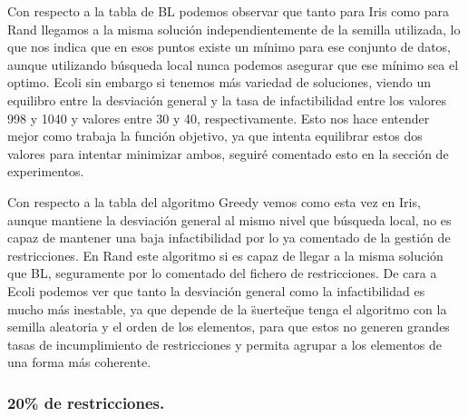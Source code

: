\documentclass[12pt, spanish]{article}
\begin{document}
Con respecto a la tabla de BL podemos observar que tanto para Iris como para Rand llegamos a la misma solución independientemente de la semilla utilizada, lo que nos indica que en esos puntos existe un mínimo para ese conjunto de datos, aunque utilizando búsqueda local nunca podemos asegurar que ese mínimo sea el optimo. Ecoli sin embargo si tenemos más variedad de soluciones, viendo un equilibro entre la desviación general y la tasa de infactibilidad entre los valores 998 y 1040 y valores entre 30 y 40, respectivamente. Esto nos hace entender mejor como trabaja la función objetivo, ya que intenta equilibrar estos dos valores para intentar minimizar ambos, seguiré comentado esto en la sección de experimentos.

Con respecto a la tabla del algoritmo Greedy vemos como esta vez en Iris, aunque mantiene la desviación general al mismo nivel que búsqueda local, no es capaz de mantener una baja infactibilidad por lo ya comentado de la gestión de restricciones. En Rand este algoritmo si es capaz de llegar a la misma solución que BL, seguramente por lo comentado del fichero de restricciones. De cara a Ecoli podemos ver que tanto la desviación general como la infactibilidad es mucho más inestable, ya que depende de la \"suerte\" que tenga el algoritmo con la semilla aleatoria y el orden de los elementos, para que estos no generen grandes tasas de incumplimiento de restricciones y permita agrupar a los elementos de una forma más coherente.

\subsubsection{20\% de restricciones.}
\end{document}
